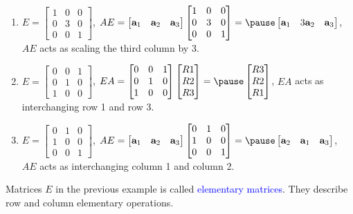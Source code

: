 \documentclass{beamer}
\theoremstyle{definition}
\theoremstyle{remark}
\newcounter{saveenumi}
\newcommand{\conti}{\setcounter{enumi}{\value{saveenumi}}}
\begin{document}
\begin{frame}[t]
\begin{example}
\begin{enumerate}
\conti
\item $E=\begin{bmatrix}
1&0&0\\
0&3&0\\
0&0&1
\end{bmatrix}$, $AE=\begin{bmatrix}
\mathbf a_1&\mathbf a_2&\mathbf a_3
\end{bmatrix}\begin{bmatrix}
1&0&0\\
0&3&0\\
0&0&1
\end{bmatrix}=\pause\begin{bmatrix}
\mathbf a_1&3\mathbf a_2&\mathbf a_3
\end{bmatrix}$, $AE$ acts as scaling the third column by 3.\pause
\item $E=\begin{bmatrix}
0&0&1\\
0&1&0\\
1&0&0
\end{bmatrix}$, $EA=\begin{bmatrix}
0&0&1\\
0&1&0\\
1&0&0
\end{bmatrix}\begin{bmatrix}
R1\\R2\\R3
\end{bmatrix}=\pause\begin{bmatrix}
R3\\R2\\R1
\end{bmatrix}$, $EA$ acts as interchanging row 1 and row 3.\pause
\item $E=\begin{bmatrix}
0&1&0\\
1&0&0\\
0&0&1
\end{bmatrix}$, $AE=\begin{bmatrix}
\mathbf a_1&\mathbf a_2&\mathbf a_3
\end{bmatrix}\begin{bmatrix}
0&1&0\\
1&0&0\\
0&0&1
\end{bmatrix}=\pause\begin{bmatrix}
\mathbf a_2&\mathbf a_1&\mathbf a_3
\end{bmatrix}$, $AE$ acts as interchanging column 1 and column 2.
\end{enumerate}
\end{example}
\pause
\begin{definition}
Matrices $E$ in the previous example is called \textcolor{blue}{elementary matrices}. They describe row and column elementary operations.
\end{definition}
\end{frame}
\end{document}
